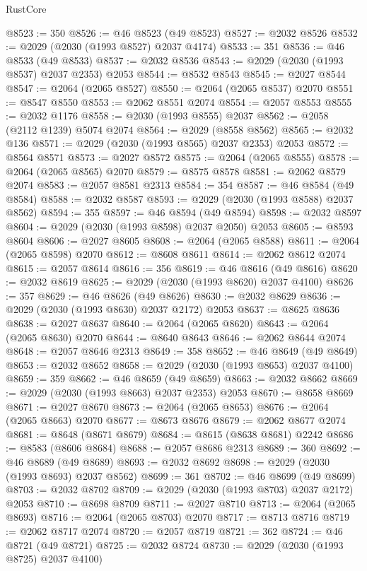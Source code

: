 \begin{lexlean}{RustCore}
\begin{coremodule}
@8523 := 350
@8526 := @46 @8523 (@49 @8523)
@8527 := @2032 @8526
@8532 := @2029 (@2030 (@1993 @8527) @2037 @4174)
@8533 := 351
@8536 := @46 @8533 (@49 @8533)
@8537 := @2032 @8536
@8543 := @2029 (@2030 (@1993 @8537) @2037 @2353) @2053
@8544 := @8532 @8543
@8545 := @2027 @8544
@8547 := @2064 (@2065 @8527)
@8550 := @2064 (@2065 @8537) @2070
@8551 := @8547 @8550
@8553 := @2062 @8551 @2074
@8554 := @2057 @8553
@8555 := @2032 @1176
@8558 := @2030 (@1993 @8555) @2037
@8562 := @2058 (@2112 @1239) @5074 @2074
@8564 := @2029 (@8558 @8562)
@8565 := @2032 @136
@8571 := @2029 (@2030 (@1993 @8565) @2037 @2353) @2053
@8572 := @8564 @8571
@8573 := @2027 @8572
@8575 := @2064 (@2065 @8555)
@8578 := @2064 (@2065 @8565) @2070
@8579 := @8575 @8578
@8581 := @2062 @8579 @2074
@8583 := @2057 @8581 @2313
@8584 := 354
@8587 := @46 @8584 (@49 @8584)
@8588 := @2032 @8587
@8593 := @2029 (@2030 (@1993 @8588) @2037 @8562)
@8594 := 355
@8597 := @46 @8594 (@49 @8594)
@8598 := @2032 @8597
@8604 := @2029 (@2030 (@1993 @8598) @2037 @2050) @2053
@8605 := @8593 @8604
@8606 := @2027 @8605
@8608 := @2064 (@2065 @8588)
@8611 := @2064 (@2065 @8598) @2070
@8612 := @8608 @8611
@8614 := @2062 @8612 @2074
@8615 := @2057 @8614
@8616 := 356
@8619 := @46 @8616 (@49 @8616)
@8620 := @2032 @8619
@8625 := @2029 (@2030 (@1993 @8620) @2037 @4100)
@8626 := 357
@8629 := @46 @8626 (@49 @8626)
@8630 := @2032 @8629
@8636 := @2029 (@2030 (@1993 @8630) @2037 @2172) @2053
@8637 := @8625 @8636
@8638 := @2027 @8637
@8640 := @2064 (@2065 @8620)
@8643 := @2064 (@2065 @8630) @2070
@8644 := @8640 @8643
@8646 := @2062 @8644 @2074
@8648 := @2057 @8646 @2313
@8649 := 358
@8652 := @46 @8649 (@49 @8649)
@8653 := @2032 @8652
@8658 := @2029 (@2030 (@1993 @8653) @2037 @4100)
@8659 := 359
@8662 := @46 @8659 (@49 @8659)
@8663 := @2032 @8662
@8669 := @2029 (@2030 (@1993 @8663) @2037 @2353) @2053
@8670 := @8658 @8669
@8671 := @2027 @8670
@8673 := @2064 (@2065 @8653)
@8676 := @2064 (@2065 @8663) @2070
@8677 := @8673 @8676
@8679 := @2062 @8677 @2074
@8681 := @8648 (@8671 @8679)
@8684 := @8615 (@8638 @8681) @2242
@8686 := @8583 (@8606 @8684)
@8688 := @2057 @8686 @2313
@8689 := 360
@8692 := @46 @8689 (@49 @8689)
@8693 := @2032 @8692
@8698 := @2029 (@2030 (@1993 @8693) @2037 @8562)
@8699 := 361
@8702 := @46 @8699 (@49 @8699)
@8703 := @2032 @8702
@8709 := @2029 (@2030 (@1993 @8703) @2037 @2172) @2053
@8710 := @8698 @8709
@8711 := @2027 @8710
@8713 := @2064 (@2065 @8693)
@8716 := @2064 (@2065 @8703) @2070
@8717 := @8713 @8716
@8719 := @2062 @8717 @2074
@8720 := @2057 @8719
@8721 := 362
@8724 := @46 @8721 (@49 @8721)
@8725 := @2032 @8724
@8730 := @2029 (@2030 (@1993 @8725) @2037 @4100)

\end{coremodule}
\end{lexlean}
